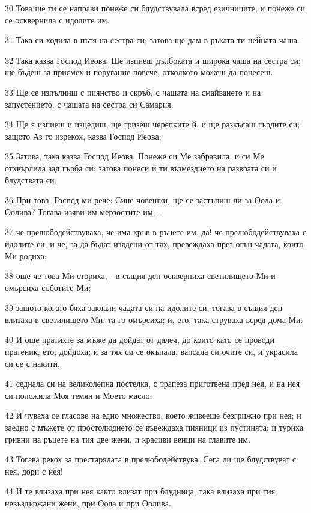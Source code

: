 \par 30 Това ще ти се направи понеже си блудствувала всред езичниците, и понеже си се осквернила с идолите им.
\par 31 Така си ходила в пътя на сестра си; затова ще дам в ръката ти нейната чаша.
\par 32 Така казва Господ Иеова: Ще изпиеш дълбоката и широка чаша на сестра си; ще бъдеш за присмех и поругание повече, отколкото можеш да понесеш.
\par 33 Ще се изпълниш с пиянство и скръб, с чашата на смайването и на запустението, с чашата на сестра си Самария.
\par 34 Ще я изпиеш и изцедиш, ще гризеш черепките й, и ще разкъсаш гърдите си; защото Аз го изрекох, казва Господ Иеова;
\par 35 Затова, така казва Господ Иеова: Понеже си Ме забравила, и си Ме отхвърлила зад гърба си; затова понеси и ти възмездието на разврата си и блудствата си.
\par 36 При това, Господ ми рече: Сине човешки, ще се застъпиш ли за Оола и Оолива? Тогава изяви им мерзостите им, -
\par 37 че прелюбодействуваха, че има кръв в ръцете им, да! че прелюбодействуваха с идолите си, и че, за да бъдат изядени от тях, превеждаха през огън чадата, които Ми родиха;
\par 38 още че това Ми сториха, - в същия ден оскверниха светилището Ми и омърсиха съботите Ми;
\par 39 защото когато бяха заклали чадата си на идолите си, тогава в същия ден влизаха в светилището Ми, та го омърсиха; и, ето, така струваха всред дома Ми.
\par 40 И още пратихте за мъже да дойдат от далеч, до които като се проводи пратеник, ето, дойдоха; и за тях си се окъпала, вапсала си очите си, и украсила си се с накити,
\par 41 седнала си на великолепна постелка, с трапеза приготвена пред нея, и на нея си положила Моя темян и Моето масло.
\par 42 И чуваха се гласове на едно множество, което живееше безгрижно при нея; и заедно с мъжете от простолюдието се въвеждаха пияници из пустинята; и туриха гривни на ръцете на тия две жени, и красиви венци на главите им.
\par 43 Тогава рекох за престарялата в прелюбодействува: Сега ли ще блудствуват с нея, дори с нея!
\par 44 И те влизаха при нея както влизат при блудница; така влизаха при тия невъздържани жени, при Оола и при Оолива.
